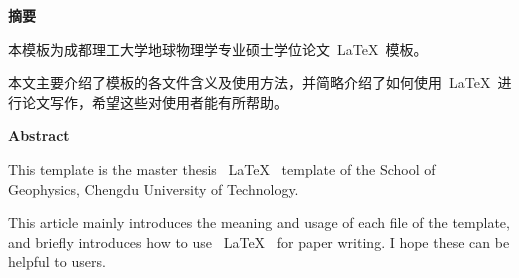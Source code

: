 \begin{cnabstract}
  \begin{center}
  \song {}  \textbf{摘要}
  \end{center}
  \vspace{18pt}
  \par
本模板为成都理工大学地球物理学专业硕士学位论文~\LaTeX~模板。

本文主要介绍了模板的各文件含义及使用方法，并简略介绍了如何使用~\LaTeX~进行论文写作，希望这些对使用者能有所帮助。

\end{cnabstract}
\vspace{1em}\par


\begin{enabstract}
  \begin{center}
  \song {}  \bfseries {Abstract}
  \end{center}
  \vspace{18pt}
  \par
This template is the master thesis ~\LaTeX~ template of the School of Geophysics, Chengdu University of Technology.

This article mainly introduces the meaning and usage of each file of the template, and briefly introduces how to use ~\LaTeX~ for paper writing. I hope these can be helpful to users.

\end{enabstract}
\vspace{1em}\par



